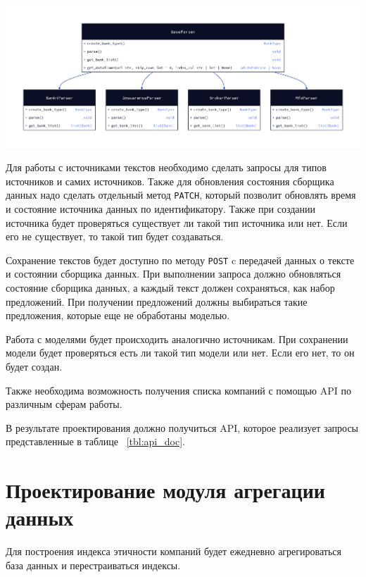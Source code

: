 \documentclass[PI, VKR]{HSEUniversity}
\begin{document}
\begin{center}
\includegraphics[width=.9\linewidth]{img/d2/cbr_parser_class.png}
\end{center}

Для работы с источниками текстов необходимо сделать запросы для типов источников и самих источников. Также для обновления состояния сборщика данных надо сделать отдельный метод \texttt{PATCH}, который позволит обновлять время и состояние источника данных по идентификатору. Также при создании источника будет проверяться существует ли такой тип источника или нет. Если его не существует, то такой тип будет создаваться.

Сохранение текстов будет доступно по методу \texttt{POST} c передачей данных о тексте и состоянии сборщика данных. При выполнении запроса должно обновляться состояние сборщика данных, а каждый текст должен сохраняться, как набор предложений. При получении предложений должны выбираться такие предложения, которые еще не обработаны моделью.

Работа с моделями будет происходить аналогично источникам. При сохранении модели будет проверяться есть ли такой тип модели или нет. Если его нет, то он будет создан.

Также необходима возможность получения списка компаний с помощью API по различным сферам работы.

В результате проектирования должно получиться API, которое реализует запросы представленные в таблице ~\ref{tbl:api_doc}.
\section{Проектирование модуля агрегации данных}
\label{sec:org7c8efc5}
Для построения индекса этичности компаний будет ежедневно агрегироваться база данных и перестраиваться индексы.
\end{document}
